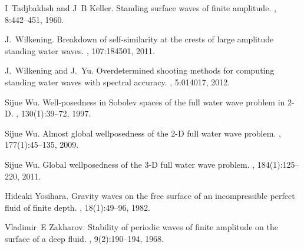 \documentclass[11pt]{article}
\theoremstyle{plain}
\theoremstyle{definition}
\theoremstyle{definition}
\begin{document}
\begin{thebibliography}{10}
I~Tadjbakhsh and J~B Keller.
\newblock Standing surface waves of finite amplitude.
, 8:442--451, 1960.

J.~Wilkening.
\newblock Breakdown of self-similarity at the crests of large amplitude
  standing water waves.
, 107:184501, 2011.

J.~Wilkening and J.~Yu.
\newblock Overdetermined shooting methods for computing standing water waves
  with spectral accuracy.
, 5:014017, 2012.

Sijue Wu.
\newblock Well-posedness in {S}obolev spaces of the full water wave problem in
  {$2$}-{D}.
, 130(1):39--72, 1997.

Sijue Wu.
\newblock Almost global wellposedness of the 2-{D} full water wave problem.
, 177(1):45--135, 2009.

Sijue Wu.
\newblock Global wellposedness of the 3-{D} full water wave problem.
, 184(1):125--220, 2011.

Hideaki Yosihara.
\newblock Gravity waves on the free surface of an incompressible perfect fluid
  of finite depth.
, 18(1):49--96, 1982.

Vladimir~E Zakharov.
\newblock Stability of periodic waves of finite amplitude on the surface of a
  deep fluid.
,
  9(2):190--194, 1968.

\end{thebibliography}
\end{document}
